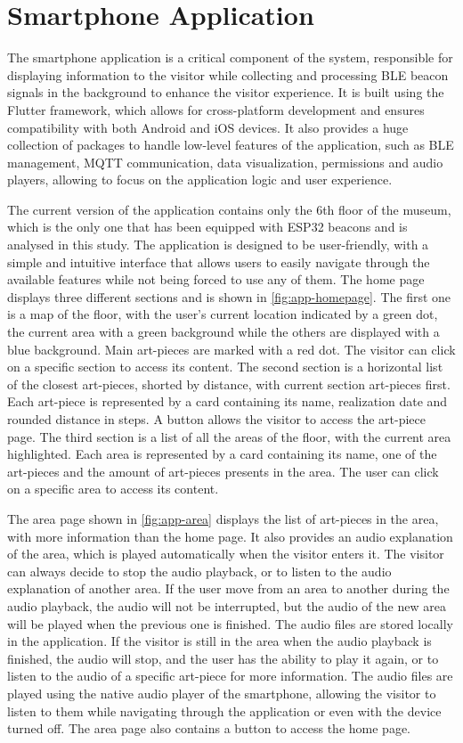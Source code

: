 \section{Smartphone Application}
The smartphone application is a critical component of the system, responsible for displaying information to the visitor while collecting and processing BLE beacon signals in the background to enhance the visitor experience. It is built using the Flutter framework, which allows for cross-platform development and ensures compatibility with both Android and iOS devices. It also provides a huge collection of packages to handle low-level features of the application, such as BLE management, MQTT communication, data visualization, permissions and audio players, allowing to focus on the application logic and user experience.

The current version of the application contains only the 6th floor of the museum, which is the only one that has been equipped with ESP32 beacons and is analysed in this study. The application is designed to be user-friendly, with a simple and intuitive interface that allows users to easily navigate through the available features while not being forced to use any of them. The home page displays three different sections and is shown in \autoref{fig:app-homepage}. The first one is a map of the floor, with the user's current location indicated by a green dot, the current area with a green background while the others are displayed with a blue background. Main art-pieces are marked with a red dot. The visitor can click on a specific section to access its content. The second section is a horizontal list of the closest art-pieces, shorted by distance, with current section art-pieces first. Each art-piece is represented by a card containing its name, realization date and rounded distance in steps. A button allows the visitor to access the art-piece page. The third section is a list of all the areas of the floor, with the current area highlighted. Each area is represented by a card containing its name, one of the art-pieces and the amount of art-pieces presents in the area. The user can click on a specific area to access its content. 

The area page shown in \autoref{fig:app-area} displays the list of art-pieces in the area, with more information than the home page. It also provides an audio explanation of the area, which is played automatically when the visitor enters it. The visitor can always decide to stop the audio playback, or to listen to the audio explanation of another area. If the user move from an area to another during the audio playback, the audio will not be interrupted, but the audio of the new area will be played when the previous one is finished. The audio files are stored locally in the application. If the visitor is still in the area when the audio playback is finished, the audio will stop, and the user has the ability to play it again, or to listen to the audio of a specific art-piece for more information. The audio files are played using the native audio player of the smartphone, allowing the visitor to listen to them while navigating through the application or even with the device turned off. The area page also contains a button to access the home page.

